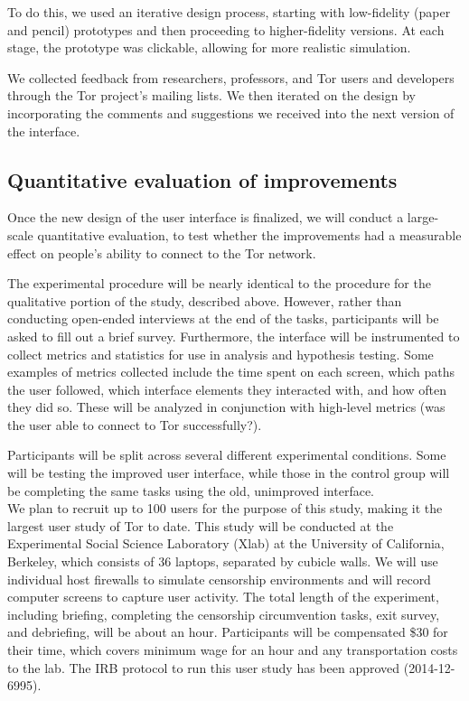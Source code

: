 \documentclass{template}
\begin{document}
To do this, we used an iterative design process, starting with low-fidelity
(paper and pencil) prototypes and then proceeding to higher-fidelity versions.
At each stage, the prototype was clickable, allowing for more realistic
simulation.


We collected feedback from researchers, professors, and Tor users and developers
through the Tor project's mailing lists. We then iterated on the design by
incorporating the comments and suggestions we received into the next version of
the interface.

\subsection{Quantitative evaluation of improvements}
Once the new design of the user interface is finalized, we will conduct a
large-scale quantitative evaluation, to test whether the improvements had a
measurable effect on people's ability to connect to the Tor network.

The experimental procedure will be nearly identical to the procedure for the
qualitative portion of the study, described above. However, rather than
conducting open-ended interviews at the end of the tasks, participants will be
asked to fill out a brief survey. Furthermore, the interface will be
instrumented to collect metrics and statistics for use in analysis and
hypothesis testing.
Some examples of metrics collected include the time spent on each screen, which
paths the user followed, which interface elements they interacted with, and how
often they did so. These will be analyzed in conjunction with high-level metrics
(was the user able to connect to Tor successfully?).

Participants will be split across several different experimental conditions.
Some will be testing the improved user interface, while those in the control
group will be completing the same tasks using the old, unimproved interface. \\

We plan to recruit up to 100 users for the purpose of this study,
making it the largest user study of Tor to date.  This study will be conducted at the
Experimental Social Science Laboratory (Xlab)
at the University of California, Berkeley, which consists of 36 laptops,
separated by cubicle walls. We will use individual host firewalls to simulate
censorship environments and will record computer screens to capture 
user activity. The total length of the experiment, including briefing, completing the censorship 
circumvention tasks, exit survey, and debriefing, will be about an hour.
Participants will be compensated \$30 for their time, which covers
minimum wage for an hour and any transportation costs to the lab. 
The IRB protocol to run this user study has been approved (2014-12-6995). 
\end{document}
